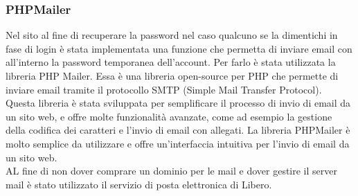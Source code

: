 \documentclass[a4paper,final,12pt]{report}
\begin{document}
\subsubsection{PHPMailer}
Nel sito al fine di recuperare la password nel caso qualcuno se la dimentichi in fase di login è stata implementata una funzione che permetta di inviare email con all'interno la password temporanea dell'account. Per farlo è stata utilizzata la libreria PHP Mailer. Essa è una libreria open-source per PHP che permette di inviare email tramite il protocollo SMTP (Simple Mail Transfer Protocol). Questa libreria è stata sviluppata per semplificare il processo di invio di email da un sito web, e offre molte funzionalità avanzate, come ad esempio la gestione della codifica dei caratteri e l'invio di email con allegati. La libreria PHPMailer è molto semplice da utilizzare e offre un'interfaccia intuitiva per l'invio di email da un sito web.\\
AL fine di non dover comprare un dominio per le mail e dover gestire il server mail è stato utilizzato il servizio di posta elettronica di Libero.
\end{document}
